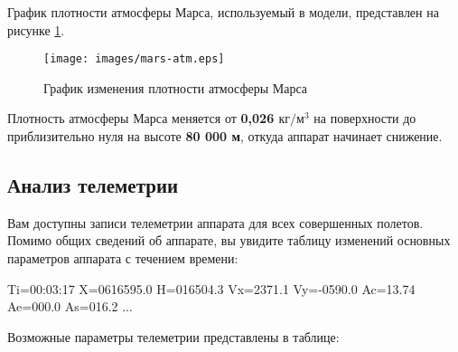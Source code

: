 \documentclass[12pt,a4paper]{article}
\begin{document}
График плотности атмосферы Марса, используемый в модели, представлен на рисунке
\ref{Pic:mars_atmosphere}.

\begin{figure}[tbh]
  \begin{center}
    \texttt{[image: images/mars-atm.eps]}
    \caption{График изменения плотности атмосферы Марса}
    \label{Pic:mars_atmosphere}
  \end{center}
\end{figure}

Плотность атмосферы Марса меняется от \textbf{0,026 $\text{кг}/\text{м}^3$} на поверхности
до приблизительно нуля на высоте \textbf{80 000 м}, откуда аппарат начинает снижение.

\subsection{Анализ телеметрии}

Вам доступны записи телеметрии аппарата для всех совершенных полетов. Помимо общих
сведений об аппарате, вы увидите таблицу изменений основных параметров аппарата с течением
времени:

\begin{verbatim*}
Ti=00:03:17 X=0616595.0 H=016504.3 Vx=2371.1 Vy=-0590.0
 Ac=13.74 Ae=000.0 As=016.2
...
\end{verbatim*}

Возможные параметры телеметрии представлены в таблице:
\end{document}
